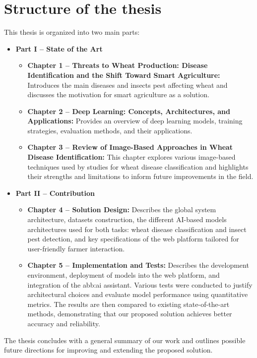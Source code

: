 \section*{Structure of the thesis}

This thesis is organized into two main parts:

\begin{itemize}
    \item \textbf{Part I – State of the Art}
    \begin{itemize}
        \item \textbf{Chapter 1 – Threats to Wheat Production: Disease Identification and the Shift Toward Smart Agriculture:} Introduces the main diseases and insects pest affecting wheat and discusses the motivation for smart agriculture as a solution.
        \item \textbf{Chapter 2 – Deep Learning: Concepts, Architectures, and Applications:} Provides an overview of deep learning models, training strategies, evaluation methods, and their applications.
        \item \textbf{Chapter 3 – Review of Image-Based Approaches in Wheat Disease Identification:} This chapter explores various image-based techniques used by studies for wheat disease classification and highlights their strengths and limitations to inform future improvements in the field.
        
    \end{itemize}

    \item \textbf{Part II – Contribution}
    \begin{itemize}
        \item \textbf{Chapter 4 – Solution Design:} Describes the global system architecture, datasets construction, the different AI-based models architectures used for both tasks: wheat disease classification and insect pest detection, and key specifications of the web platform tailored for user-friendly farmer interaction.
        \item \textbf{Chapter 5 – Implementation and Tests:} Describes the development environment, deployment of models into the web platform, and integration of the \gls{abb:ai} assistant. Various tests were conducted to justify architectural choices and evaluate model performance using quantitative metrics. The results are then compared to existing state-of-the-art methods, demonstrating that our proposed solution achieves better accuracy and reliability.
    \end{itemize}
\end{itemize}

The thesis concludes with a general summary of our work and outlines possible future directions for improving and extending the proposed solution.
